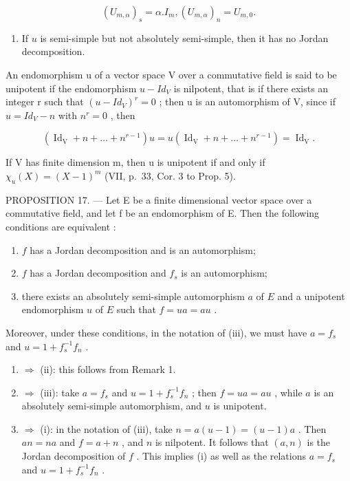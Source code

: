 \[
(U _ {m, \alpha}) _ {s} = \alpha . I _ {m}, (U _ {m, \alpha}) _ {n} = U _ {m, 0}.
\]

\begin{enumerate}
\def\labelenumi{\arabic{enumi})}
\setcounter{enumi}{3}
\tightlist
\item
  If \(u\) is semi-simple but not absolutely semi-simple, then it has no Jordan decomposition.
\end{enumerate}

An endomorphism u of a vector space V over a commutative field is said to be unipotent if the endomorphism \(u - Id_{V}\) is nilpotent, that is if there exists an integer r such that \((u - Id_{V})^{r} = 0\) ; then u is an automorphism of V, since if \(u = Id_{V} - n\) with \(n^{r} = 0\) , then

\[
\left(\operatorname{Id} _ {\mathrm{V}} + n + \dots + n ^ {r - 1}\right) u = u \left(\operatorname{Id} _ {\mathrm{V}} + n + \dots + n ^ {r - 1}\right) = \operatorname{Id} _ {\mathrm{V}}.
\]

If V has finite dimension m, then u is unipotent if and only if \(\chi_{u}(X)=(X-1)^{m}\) (VII, p.~33, Cor. 3 to Prop. 5).

PROPOSITION 17. --- Let E be a finite dimensional vector space over a commutative field, and let f be an endomorphism of E. Then the following conditions are equivalent :

\begin{enumerate}
\def\labelenumi{(\roman{enumi})}
\item
  \(f\) has a Jordan decomposition and is an automorphism;
\item
  \(f\) has a Jordan decomposition and \(f_{s}\) is an automorphism;
\item
  there exists an absolutely semi-simple automorphism \(a\) of \(E\) and a unipotent endomorphism \(u\) of \(E\) such that \(f = ua = au\) .
\end{enumerate}

Moreover, under these conditions, in the notation of (iii), we must have \(a = f_{s}\) and \(u = 1 + f_{s}^{-1}f_{n}\) .

\begin{enumerate}
\def\labelenumi{(\roman{enumi})}
\item
  \(\Rightarrow\) (ii): this follows from Remark 1.
\item
  \(\Rightarrow\) (iii): take \(a = f_{s}\) and \(u = 1 + f_{s}^{-1}f_{n}\) ; then \(f = ua = au\) , while \(a\) is an absolutely semi-simple automorphism, and \(u\) is unipotent.
\item
  \(\Rightarrow\) (i): in the notation of (iii), take \(n = a(u - 1) = (u - 1)a\) . Then \(an = na\) and \(f = a + n\) , and \(n\) is nilpotent. It follows that \((a, n)\) is the Jordan decomposition of \(f\) . This implies (i) as well as the relations \(a = f_s\) and \(u = 1 + f_s^{-1}f_n\) .
\end{enumerate}

